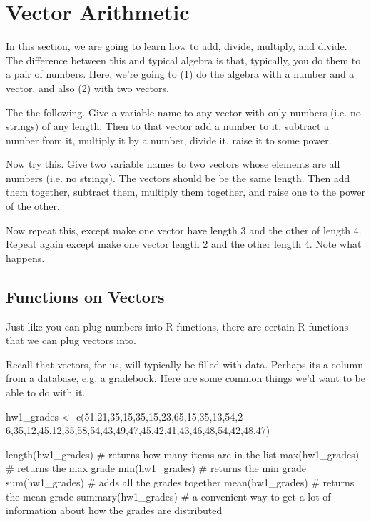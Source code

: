 \section{Vector Arithmetic}

In this section, we are going to learn how to add, divide, multiply, and divide. The difference between this and typical algebra is that, typically, you do them to a pair of numbers.  Here, we're going to (1) do the algebra with a number and a vector, and also (2) with two vectors.
  
The the following. Give a variable name to any vector with only
numbers (i.e. no strings) of any length.  Then to that vector add a
number to it, subtract a number from it, multiply it by a number,
divide it, raise it to some power.


Now try this. Give two variable names to two vectors whose elements
are all numbers (i.e. no strings). The vectors should be be the same
length. Then add them together, subtract them, multiply them together,
and raise one to the power of the other.

Now repeat this, except make one vector have length 3 and the other of
length 4. Repeat again except make one vector length 2 and the other
length 4.  Note what happens.

\subsection{Functions on Vectors}

Just like you can plug numbers into R-functions, there are certain
R-functions that we can plug vectors into.
  
Recall that vectors, for us, will typically be filled with data. Perhaps its a column from a database, e.g. a gradebook. Here are some common things we'd want to be able to do with it.
  
\begin{example}
  \begin{rcode}
    hw1_grades <-  c(51,21,35,15,35,15,23,65,15,35,13,54,2
    6,35,12,45,12,35,58,54,43,49,47,45,42,41,43,46,48,54,42,48,47)
    
    length(hw1_grades) # returns how many items are in the list
    max(hw1_grades) # returns the max grade
    min(hw1_grades) # returns the min grade
    sum(hw1_grades) # adds all the grades together
    mean(hw1_grades) # returns the mean grade
    summary(hw1_grades) # a convenient way to get a lot of information about how the grades are distributed
  \end{rcode}
\end{example}
  
